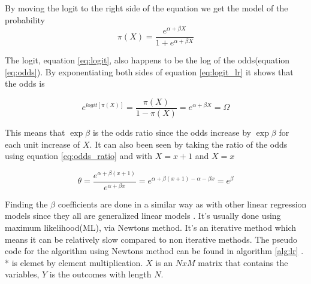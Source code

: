\documentclass[10pt,a4paper]{report}
\begin{document}
By moving the logit to the right side of the equation we get the model of the probability\cite{agresti_categorical}
\begin{equation}
\pi(X)=\frac{e^{\alpha+\beta X}}{1+e^{\alpha+\beta X}}
\end{equation}

The logit, equation \ref{eq:logit}, also happens to be the log of the odds(equation \ref{eq:odds})\cite{agresti_categorical}. By exponentiating both sides of equation \ref{eq:logit_lr} it shows that the odds is \cite{agresti_categorical}

\begin{equation}
e^{logit[\pi(X)]}=\frac{\pi(X)}{1-\pi(X)}=e^{\alpha+\beta X}=\Omega
\end{equation}

This means that $\exp{\beta}$ is the odds ratio since the odds increase by $\exp{\beta}$ for each unit increase of $X$\cite{agresti_categorical}. It can also been seen by taking the ratio of the odds using equation \ref{eq:odds_ratio} and  with $X=x+1$ and $X=x$

\begin{equation}
\theta=\frac{e^{\alpha+\beta (x+1)}}{e^{\alpha+\beta x}}=e^{\alpha+\beta (x+1)-\alpha-\beta x}=e^{\beta}
\end{equation}

Finding the $\beta$ coefficients are done in a similar way as with other linear regression models since they all are generalized linear models \cite{agresti_categorical}. It's usually done using  maximum likelihood(ML), via Newtons method\cite{agresti_categorical, uvehag_master_thesis}. It's an iterative method which means it can be relatively slow compared to non iterative methods. The pseudo code for the algorithm using Newtons method can be found in algorithm \ref{alg:lr} \cite{uvehag_master_thesis}. * is elemet by element multiplication. $X$ is an $NxM$ matrix that contains the variables, $Y$ is the outcomes with length $N$.
\end{document}
